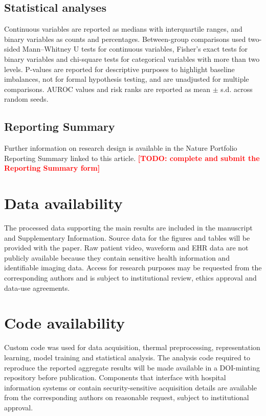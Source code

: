 \documentclass[11pt]{article}
\newcommand{\TODO}[1]{\textbf{\textcolor{red}{[TODO: #1]}}}
\begin{document}
\subsection*{Statistical analyses}

Continuous variables are reported as medians with interquartile ranges, and binary variables as counts and percentages. Between-group comparisons used two-sided Mann--Whitney U tests for continuous variables, Fisher's exact tests for binary variables and chi-square tests for categorical variables with more than two levels. P-values are reported for descriptive purposes to highlight baseline imbalances, not for formal hypothesis testing, and are unadjusted for multiple comparisons. AUROC values and risk ranks are reported as mean $\pm$ s.d. across random seeds.

\subsection*{Reporting Summary}

Further information on research design is available in the Nature Portfolio Reporting Summary linked to this article. \TODO{complete and submit the Reporting Summary form}

\section*{Data availability}

The processed data supporting the main results are included in the manuscript and Supplementary Information. Source data for the figures and tables will be provided with the paper. Raw patient video, waveform and EHR data are not publicly available because they contain sensitive health information and identifiable imaging data. Access for research purposes may be requested from the corresponding authors and is subject to institutional review, ethics approval and data-use agreements.

\section*{Code availability}

Custom code was used for data acquisition, thermal preprocessing, representation learning, model training and statistical analysis. The analysis code required to reproduce the reported aggregate results will be made available in a DOI-minting repository before publication. Components that interface with hospital information systems or contain security-sensitive acquisition details are available from the corresponding authors on reasonable request, subject to institutional approval.
\end{document}
